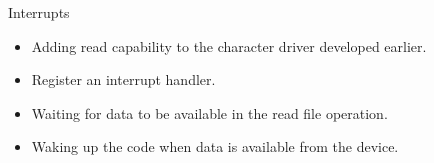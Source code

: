 \setuplabframe
{Interrupts}
{
  \begin{itemize}
  \item Adding read capability to the character driver developed
    earlier.
  \item Register an interrupt handler.
  \item Waiting for data to be available in the read file operation.
  \item Waking up the code when data is available from the device.
  \end{itemize}
}

